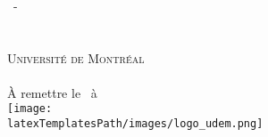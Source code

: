 
\singlespacing
\begin{titlepage}
    \begin{center}
        \vspace*{0.5in}
        \LARGE{\textsc{\docTitle}}\\
        \vspace*{0.1in}
        \Large{\textsc{\docSubtitle}}\\
        \vfill
        \Large{\textsc{\docAuthorTitlePage}}\\
        \vspace*{0.1in}
        \Large{\textsc{\docClass\ -\ \docClassNumber}}\\
        \vfill
        \Large{\docClassSection}\\
        \vspace*{0.1in}
        \large{\textsc{\docClassInstructor}}\\
        \vfill
        \large{\textsc{Université de Montréal}}\\
        \vspace*{0.1in}
        \small{\docClassSemester }\\
        \small{À remettre le \docDueDate\ à \docDueTime}\\
        \vfill
        \texttt{[image: \\latexTemplatesPath/images/logo\_udem.png]}
        \vfill
    \end{center}
\end{titlepage}
\pagebreak
{}\tableofcontents\pagebreak
\doublespacing

